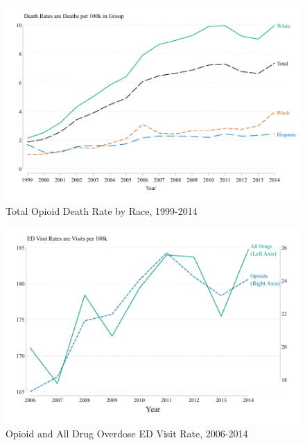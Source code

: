 \documentclass[12pt]{article}
\begin{document}
\begin{figure}[ht!]
		\centering
		\caption{Total Opioid Death Rate by Race, 1999-2014}
\begin{center}
			  	\includegraphics[width=\linewidth]{../results/figures/figure_2_opioid_deaths_by_race_over_time.pdf}
		\end{center}		\label{fig:opioid_deaths_by_race_and_time}
	 	\footnotesize{}
\end{figure}

\begin{figure}[ht!]
\centering
		\caption{Opioid and All Drug Overdose ED Visit Rate, 2006-2014}
\begin{center}
			  	\includegraphics[width=\linewidth]{../results/figures/figure_3_drug_op_ed_rate_06_14.pdf}
		\end{center}		\label{fig:drug_opioid_deaths_by_race_and_time}
  		\label{fig:ed_by_type}
	 	\footnotesize{}
\end{figure}
\end{document}
